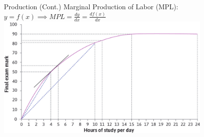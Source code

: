 \documentclass{beamer}
\begin{document}
\begin{frame}[t]{Production (Cont.)}
    Marginal Production of Labor (MPL): $y = f\left( x \right)  \implies MPL = \frac{dy}{dx} = \frac{df\left( x \right) }{dx} $
    \centering
    \includegraphics[width=0.8\textwidth]{./figures/production-2.png}

\end{frame}
\end{document}
